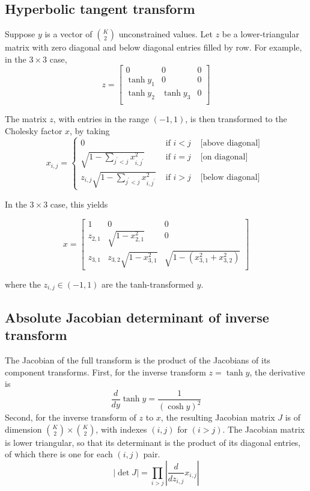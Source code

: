 \documentclass[11pt]{article}
\begin{document}
\subsection{Hyperbolic tangent transform}


Suppose $y$ is a vector of $\binom{K}{2}$ unconstrained values. Let $z$ be a lower-triangular matrix with zero diagonal and below diagonal entries filled by row. For example, in the $3 \times 3$ case,
\[
z = \begin{bmatrix}
0 & 0 & 0\\
\tanh{y_1} & 0 & 0\\
\tanh{y_2} & \tanh{y_3} & 0\\
\end{bmatrix}
\]

The matrix $z$, with entries in the range $( -1, 1)$, is then transformed to the Cholesky factor $x$, by taking
\[
x_{i, j}=\left\{\begin{array}{lll}
0 & \text { if } i<j & \text { [above diagonal] } \\
\sqrt{1-\sum_{j^{\prime}<j} x_{i, j^{\prime}}^{2}} & \text { if } i=j & \text { [on diagonal] } \\
z_{i, j} \sqrt{1-\sum_{j^{\prime}<j} x_{i, j^{\prime}}^{2}} & \text { if } i>j & \text { [below diagonal] }
\end{array}\right.
\]

In the $3 \times 3$ case, this yields

\[
x=\left[\begin{array}{ccc}
1 & 0 & 0 \\
z_{2,1} & \sqrt{1-x_{2,1}^{2}} & 0 \\
z_{3,1} & z_{3,2} \sqrt{1-x_{3,1}^{2}} & \sqrt{1-\left(x_{3,1}^{2}+x_{3,2}^{2}\right)}
\end{array}\right]
\]

where the $z_{i,j}\in (-1, 1)$ are the tanh-transformed $y$.

\subsection{Absolute Jacobian determinant of inverse transform}

The Jacobian of the full transform is the product of the Jacobians of its component
transforms. First, for the inverse transform $z = \tanh{y}$, the derivative is
\[
\frac{d}{dy} \tanh y = \frac{1}{(\cosh y)^{2}}
\]
Second, for the inverse transform of $z$ to $x$, the resulting Jacobian matrix $J$ is of
dimension $\binom{K}{2} \times \binom{K}{2}$, with indexes $(i, j)$ for $(i > j)$. The Jacobian matrix is lower
triangular, so that its determinant is the product of its diagonal entries, of which
there is one for each $(i, j)$ pair.
\[
|\operatorname{det} J|=\prod_{i>j}\left|\frac{d}{d z_{i, j}} x_{i, j}\right|
\]
\end{document}
